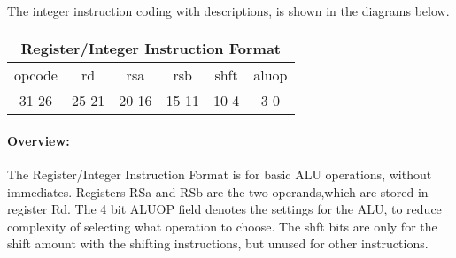 \documentclass[letterpaper, 11pt]{article}
\begin{document}
\paragraph{}The integer instruction coding with descriptions, is shown in the diagrams below.

\begin{center}
		\begin{tabular}{|c|c|c|c|c|c|}
			\multicolumn{6}{c}{Register/Integer Instruction Format}\\ \hline
				\hspace{2pt} opcode \hspace{2pt} & \hspace{5pt} rd \hspace{5pt} &  \hspace{4pt} rsa \hspace{4pt} & \hspace{4pt}rsb  \hspace{4pt}& \hspace{10pt}shft  \hspace{10pt} & \hspace{3pt} aluop \hspace{3pt}   \\	\hline
			31 \hfill 26& 25 \hfill 21 &20 \hfill  16& 15 \hfill  11&10 \hfill   4&3 \hfill   0\\ \hline
		
	\end{tabular}
\end{center}	
\paragraph{Overview:}The Register/Integer Instruction Format is for basic ALU operations, without immediates. Registers RSa and RSb are the two operands,which
are stored in register Rd. The 4 bit ALUOP field denotes the settings for the ALU, to reduce complexity of selecting what operation to choose.
The shft bits are only for the shift amount with the shifting instructions, but unused for other instructions. 
\end{document}
